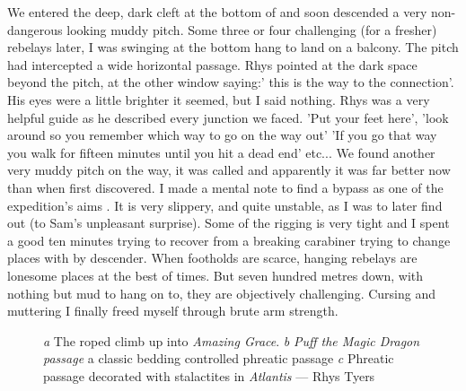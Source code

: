 We entered the deep, dark cleft at the bottom of  and soon descended a very non-dangerous looking muddy pitch. Some three or four challenging (for a fresher) rebelays later, I was swinging at the bottom hang to land on a balcony. The pitch had intercepted a wide horizontal passage. Rhys pointed at the dark space beyond the pitch, at the other window saying:' this is the way to the connection'. His eyes were a little brighter it seemed, but I said nothing. Rhys was a very helpful guide as he described every junction we faced. 'Put your feet here', 'look around so you remember which way to go on the way out' 'If you go that way you walk for fifteen minutes until you hit a dead end' etc... We found another very muddy pitch on the way,  it was called and apparently it was far better now than when first discovered. I made a mental note to find a bypass as one of the expedition's aims . It is very slippery, and quite unstable, as I was to later find out (to Sam's unpleasant surprise). Some of the rigging is very tight and I spent a good ten minutes trying to recover from a breaking carabiner trying to change places with by descender. When footholds are scarce, hanging rebelays are lonesome places at the best of times. But seven hundred metres down, with nothing but mud to hang on to, they are objectively challenging. Cursing and muttering I finally freed myself through brute arm strength.

\begin{figure}[t!]
\checkoddpage \ifoddpage \forcerectofloat \else \forceversofloat \fi
\centering
    \begin{subfigure}[t]{0.393\textwidth}
        \centering
        \caption{} \label{HelmsDeep}
    \end{subfigure}
        \hfill
\begin{subfigure}[t]{0.59\textwidth}
\centering
{}
 \caption{}\label{water chamber below helm's deep}
\end{subfigure}
    \vspace{0cm}
    \begin{subfigure}[t]{\textwidth}
    \centering
        \caption{} \label{Atlantis}
    \end{subfigure}
    \caption{
    \emph{a} The roped climb up into \emph{Amazing Grace}.  
     \emph{b} \emph{Puff the Magic Dragon passage} a classic bedding controlled phreatic passage
     \emph{c} Phreatic passage decorated with stalactites in \emph{Atlantis} --- Rhys Tyers }
\end{figure}

